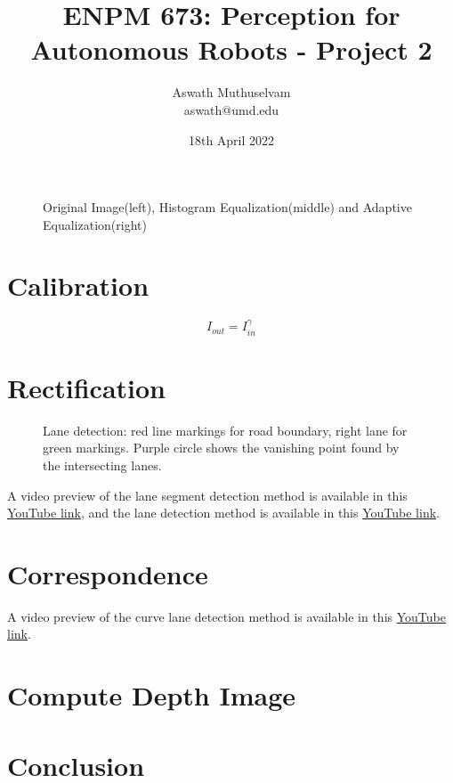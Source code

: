 \documentclass[a4paper, 10pt]{article}
\title{ENPM 673: Perception for Autonomous Robots - Project 2}
\author{Aswath Muthuselvam \\ aswath@umd.edu}
\date{18th April 2022}
\begin{document}
	\maketitle
	
	\begin{figure}[b]
		\centering
		\caption{Original Image(left), Histogram Equalization(middle) and Adaptive Equalization(right)}
		\label{fig:HistEQ}
	\end{figure}
	
	\begin{multicols}{2}
		
		\section{Calibration}
		
		
		\begin{equation} \label{eq:gamma}
		I_{out}=I_{in}^{\gamma}
		\end{equation}
		
		\section{Rectification}
		
		
		\begin{figure}[H]
			\centering
			\caption{Lane detection: red line markings for road boundary, right lane for green markings. Purple circle shows the vanishing point found by the intersecting lanes.}
			\label{fig:straight_segments}
		\end{figure}
		
		A video preview of the lane segment detection method is available in this \href{https://youtu.be/6CWymeqQOWk}{YouTube link}, and the lane detection method is available in this \href{https://youtu.be/fkf3r3iCl74}{YouTube link}.
		
		\section{Correspondence}	
		
		
		A video preview of the curve lane detection method is available in this \href{https://youtu.be/5v3jpyDuoz4}{YouTube link}.
		
		
		
		\section{Compute Depth Image}
		
		
		\section{Conclusion}	
		
		
	\end{multicols}
	
	
	
\end{document}
